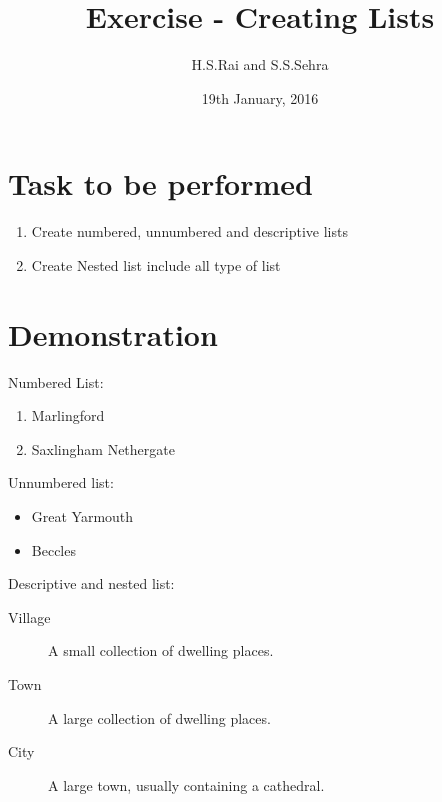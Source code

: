 \documentclass[12pt]{article}
\title{Exercise  - Creating Lists }
\author{H.S.Rai and S.S.Sehra}
\date{19th January, 2016}
\begin{document}
	\maketitle
	\section*{Task to be performed}
	\begin{enumerate}
		\item Create numbered, unnumbered and descriptive lists
		\item Create Nested list include all type of list
	\end{enumerate}
\section*{Demonstration}	
Numbered List:
	
\begin{enumerate}
	   	
\item Marlingford
   	
\item Saxlingham Nethergate
	   	
\end{enumerate}

Unnumbered list:
\begin{itemize}
	
	\item Great Yarmouth
	
	\item Beccles
	
\end{itemize}

Descriptive and nested list:
\begin{description}

  \item[Village] A small collection of dwelling places. 
   \item[Town] A large collection of dwelling places.    
  \item[City] A large town, usually containing a cathedral.  
\end{description}
\end{document}
